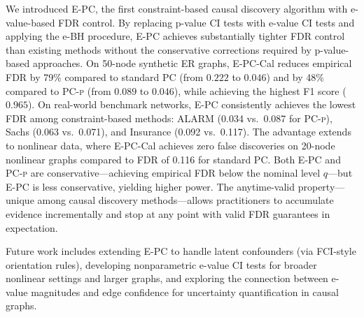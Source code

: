 \documentclass[11pt]{article}
\newcommand{\epc}{\textsc{E-PC}}
\newcommand{\pcp}{\textsc{PC-p}}
\begin{document}
We introduced \epc{}, the first constraint-based causal discovery algorithm with e-value-based FDR control. By replacing p-value CI tests with e-value CI tests and applying the e-BH procedure, \epc{} achieves substantially tighter FDR control than existing methods without the conservative corrections required by p-value-based approaches. On 50-node synthetic ER graphs, \epc{}-Cal reduces empirical FDR by 79\% compared to standard PC (from $0.222$ to $0.046$) and by 48\% compared to \pcp{} (from $0.089$ to $0.046$), while achieving the highest F1 score ($0.965$). On real-world benchmark networks, \epc{} consistently achieves the lowest FDR among constraint-based methods: ALARM (0.034 vs.\ 0.087 for \pcp{}), Sachs (0.063 vs.\ 0.071), and Insurance (0.092 vs.\ 0.117). The advantage extends to nonlinear data, where \epc{}-Cal achieves zero false discoveries on 20-node nonlinear graphs compared to FDR of 0.116 for standard PC. Both \epc{} and \pcp{} are conservative---achieving empirical FDR below the nominal level $q$---but \epc{} is less conservative, yielding higher power. The anytime-valid property---unique among causal discovery methods---allows practitioners to accumulate evidence incrementally and stop at any point with valid FDR guarantees in expectation.

Future work includes extending \epc{} to handle latent confounders (via FCI-style orientation rules), developing nonparametric e-value CI tests for broader nonlinear settings and larger graphs, and exploring the connection between e-value magnitudes and edge confidence for uncertainty quantification in causal graphs.



\end{document}
